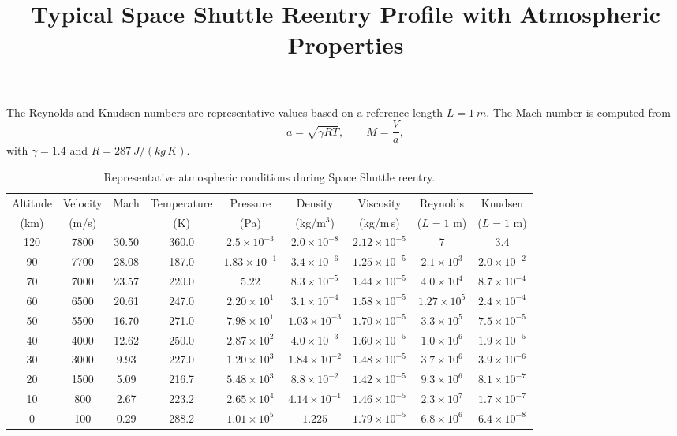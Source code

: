 \documentclass{article}
\begin{document}
\title{Typical Space Shuttle Reentry Profile with Atmospheric Properties}
\date{}
\maketitle

The Reynolds and Knudsen numbers are representative values based on a reference length
$L = \SI{1}{m}$. The Mach number is computed from
\[
a = \sqrt{\gamma R T}, \qquad M = \frac{V}{a},
\]
with $\gamma = 1.4$ and $R = \SI{287}{J/(kg\,K)}$.

\begin{table}[h!]
\centering
\small
\begin{tabular}{ccccccccc}
\toprule
Altitude & Velocity & Mach & Temperature & Pressure & Density & Viscosity & Reynolds & Knudsen \\
(km) & (m/s) &  & (K) & (Pa) & (kg/m$^3$) & (kg/m\,s) & ($L=1$ m) & ($L=1$ m) \\
\midrule
120 & 7800 & 30.50 & 360.0 & $2.5\times10^{-3}$ & $2.0\times10^{-8}$ & $2.12\times10^{-5}$ & $7$ & $3.4$ \\
90  & 7700 & 28.08 & 187.0 & $1.83\times10^{-1}$ & $3.4\times10^{-6}$ & $1.25\times10^{-5}$ & $2.1\times10^{3}$ & $2.0\times10^{-2}$ \\
70  & 7000 & 23.57 & 220.0 & $5.22$ & $8.3\times10^{-5}$ & $1.44\times10^{-5}$ & $4.0\times10^{4}$ & $8.7\times10^{-4}$ \\
60  & 6500 & 20.61 & 247.0 & $2.20\times10^{1}$ & $3.1\times10^{-4}$ & $1.58\times10^{-5}$ & $1.27\times10^{5}$ & $2.4\times10^{-4}$ \\
50  & 5500 & 16.70 & 271.0 & $7.98\times10^{1}$ & $1.03\times10^{-3}$ & $1.70\times10^{-5}$ & $3.3\times10^{5}$ & $7.5\times10^{-5}$ \\
40  & 4000 & 12.62 & 250.0 & $2.87\times10^{2}$ & $4.0\times10^{-3}$ & $1.60\times10^{-5}$ & $1.0\times10^{6}$ & $1.9\times10^{-5}$ \\
30  & 3000 & 9.93 & 227.0 & $1.20\times10^{3}$ & $1.84\times10^{-2}$ & $1.48\times10^{-5}$ & $3.7\times10^{6}$ & $3.9\times10^{-6}$ \\
20  & 1500 & 5.09 & 216.7 & $5.48\times10^{3}$ & $8.8\times10^{-2}$ & $1.42\times10^{-5}$ & $9.3\times10^{6}$ & $8.1\times10^{-7}$ \\
10  & 800 & 2.67 & 223.2 & $2.65\times10^{4}$ & $4.14\times10^{-1}$ & $1.46\times10^{-5}$ & $2.3\times10^{7}$ & $1.7\times10^{-7}$ \\
0   & 100 & 0.29 & 288.2 & $1.01\times10^{5}$ & $1.225$ & $1.79\times10^{-5}$ & $6.8\times10^{6}$ & $6.4\times10^{-8}$ \\
\bottomrule
\end{tabular}
\caption{Representative atmospheric conditions during Space Shuttle reentry.}
\end{table}
\end{document}
